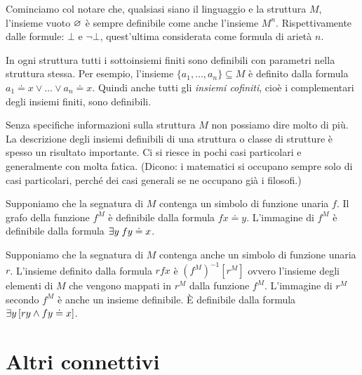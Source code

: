 \begin{example}
Cominciamo col notare che, qualsiasi siano il linguaggio e la struttura $M$, l'insieme vuoto $\varnothing$ \`e sempre definibile come anche l'insieme $M^n$. Rispettivamente dalle formule: $\bot$ e $\neg\bot$, quest'ultima considerata come formula di ariet\`a $n$.

In ogni struttura tutti i sottoinsiemi finiti sono definibili con parametri nella struttura stessa. Per esempio, l'insieme $\{a_1,\dots,a_n\}\subseteq M$ \`e definito dalla formula $a_1\doteq x\vee \dots\vee a_n\doteq x$. Quindi anche tutti gli \emph{insiemi cofiniti\/}, cio\`e i complementari degli insiemi finiti, sono definibili.

Senza specifiche informazioni sulla struttura $M$ non possiamo dire molto di pi\`u. La descrizione degli insiemi definibili di una struttura o classe di strutture \`e spesso un risultato importante. Ci si riesce in pochi casi particolari e generalmente con molta fatica. (Dicono: i  matematici si occupano sempre solo di casi particolari, perch\'e dei casi generali se ne occupano gi\`a i filosofi.)\QED
\end{example}

\begin{example}\label{definibilitaimmagine}
Supponiamo che la segnatura di $M$ contenga un simbolo di funzione unaria $f$. Il grafo della funzione $f^M$ \`e definibile dalla formula $fx\doteq y$. L'immagine di $f^M$ \`e  definibile dalla formula $\exists y\; fy\doteq x$. 

Supponiamo che la segnatura di $M$ contenga anche un simbolo di funzione unaria $r$. L'insieme definito dalla formula $rfx$ \`e $(f^M)^{-1}[r^M]$ ovvero l'insieme degli elementi di $M$ che vengono mappati in $r^M$ dalla funzione $f^M$. L'immagine di $r^M$ secondo $f^M$ \`e anche un insieme definibile. \`E definibile dalla formula $\exists y\,[r y\wedge fy\doteq x]$.\QED
\end{example}


\section{Altri connettivi}\label{Altriconnettivi}



